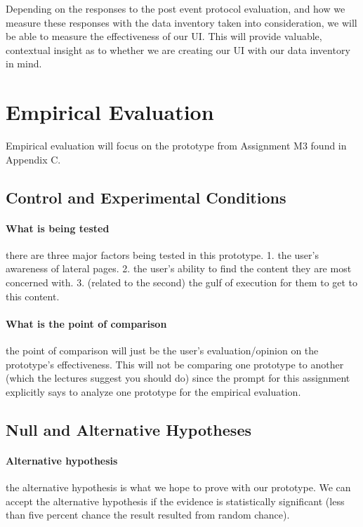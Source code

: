 Depending on the responses to the post event protocol evaluation, and how we measure these responses with the data inventory taken into consideration, we will be able to measure the effectiveness of our UI. This will provide valuable, contextual insight as to whether we are creating our UI with our data inventory in mind.

\section{Empirical Evaluation}
Empirical evaluation will focus on the prototype from Assignment M3 found in Appendix C.

\subsection{Control and Experimental Conditions}
\paragraph{What is being tested} there are three major factors being tested in this prototype. 1. the user's awareness of lateral pages. 2. the user's ability to find the content they are most concerned with. 3. (related to the second) the gulf of execution for them to get to this content.

\paragraph{What is the point of comparison} the point of comparison will just be the user's evaluation/opinion on the prototype's effectiveness. This will not be comparing one prototype to another (which the lectures suggest you should do) since the prompt for this assignment explicitly says to analyze one prototype for the empirical evaluation.

\subsection{Null and Alternative Hypotheses}

\paragraph{Alternative hypothesis} the alternative hypothesis is what we hope to prove with our prototype. We can accept the alternative hypothesis if the evidence is statistically significant (less than five percent chance the result resulted from random chance).

